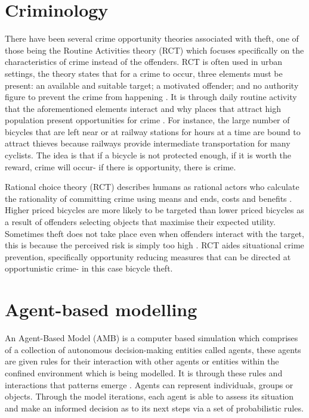 \documentclass[11pt]{informatics-report}
\begin{document}
\section{Criminology}
There have been several crime opportunity theories associated with theft, one of those being the Routine Activities theory (RCT) \cite{cohen} which focuses specifically on the characteristics of crime instead of the offenders. RCT is often used in urban settings, the theory states that for a crime to occur, three elements must be present: an available and suitable target; a motivated offender; and no authority figure to prevent the crime from happening \cite{rational}. It is through daily routine activity that the aforementioned elements interact and why places that attract high population present opportunities for crime \cite{sherman}. For instance, the large number of bicycles that are left near or at railway stations for hours at a time are bound to attract thieves because railways provide intermediate transportation for many cyclists. The idea is that if a bicycle is not protected enough, if it is worth the reward, crime will occur- if there is opportunity, there is crime. \par

Rational choice theory (RCT) describes humans as rational actors who calculate the rationality of committing crime using means and ends, costs and benefits \cite{cornishclarke}. Higher priced bicycles are more likely to be targeted than lower priced bicycles as a result of offenders selecting objects that maximise their expected utility. Sometimes theft does not take place even when offenders interact with the target, this is because the perceived risk is simply too high \cite{environment}. RCT aides situational crime prevention, specifically opportunity reducing measures that can be directed at opportunistic crime- in this case bicycle theft. \par


\section{Agent-based modelling}
An Agent-Based Model (AMB) is a computer based simulation which comprises of a collection of autonomous decision-making entities called agents, these agents are given rules for their interaction with other agents or entities within the confined environment which is being modelled. It is through these rules and interactions that patterns emerge \cite{abm}. Agents can represent individuals, groups or objects. Through the model iterations, each agent is able to assess its situation and make an informed decision as to its next steps via a set of probabilistic rules.\par
\end{document}
